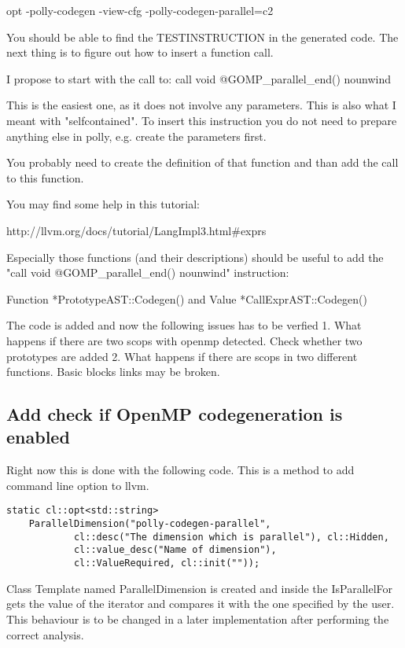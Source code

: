 \documentclass[a4paper,10pt]{article}
\begin{document}
opt -polly-codegen -view-cfg -polly-codegen-parallel=c2

You should be able to find the TESTINSTRUCTION in the generated code. The next thing is to figure out how to insert a function call.

I propose to start with the call to:
call void @GOMP\_parallel\_end() nounwind

This is the easiest one, as it does not involve any parameters. This is also what I meant with "selfcontained". To insert this instruction you do not need to prepare anything else in polly, e.g. create the parameters first.

You probably need to create the definition of that function and than add the call to this function.

You may find some help in this tutorial:

http://llvm.org/docs/tutorial/LangImpl3.html\#exprs

Especially those functions (and their descriptions) should be useful to add the "call void @GOMP\_parallel\_end() nounwind" instruction:

Function *PrototypeAST::Codegen()
and
Value *CallExprAST::Codegen()

The code is added and now the following issues has to be verfied
1. What happens if there are two scops with openmp detected. Check whether two prototypes are added
2. What happens if there are scops in two different functions. Basic blocks links may be broken.

\subsection{Add check if OpenMP codegeneration is enabled}

Right now this is done with the following code. This is a method to add command line option to llvm.

\begin{verbatim}
static cl::opt<std::string>
    ParallelDimension("polly-codegen-parallel",
            cl::desc("The dimension which is parallel"), cl::Hidden,
            cl::value_desc("Name of dimension"),
            cl::ValueRequired, cl::init(""));
\end{verbatim}

Class Template named ParallelDimension is created and inside the IsParallelFor gets the value of
the iterator and compares it with the one specified by the user. This behaviour is to be changed
in a later implementation after performing the correct analysis.
\end{document}
